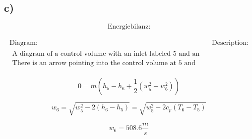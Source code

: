 

\subsection*{c)}

\[
\text{Energiebilanz:}
\]

\[
\begin{array}{c}
\begin{array}{c|c}
\text{Diagram:} & \text{Description:} \\
\hline
\begin{array}{c}
\text{A diagram of a control volume with an inlet labeled 5 and an outlet labeled 6.} \\
\text{There is an arrow pointing into the control volume at 5 and an arrow pointing out of the control volume at 6.}
\end{array}
\end{array}
\end{array}
\]

\[
0 = \dot{m} \left( h_5 - h_6 + \frac{1}{2} (w_5^2 - w_6^2) \right)
\]

\[
w_6 = \sqrt{w_5^2 - 2 (h_6 - h_5)} = \sqrt{w_5^2 - 2 c_p (T_6 - T_5)}
\]

\[
w_6 = 508.6 \frac{m}{s}
\]